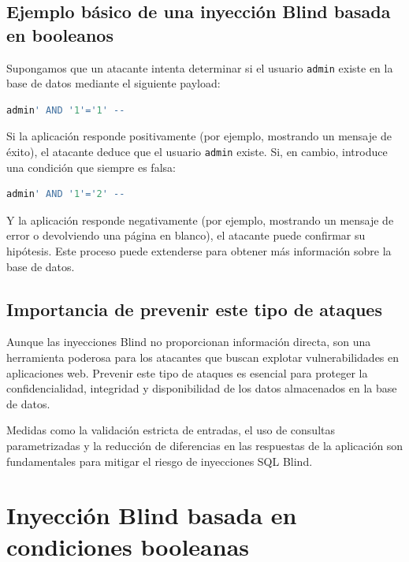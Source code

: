 \documentclass[a4paper,12pt]{article}
\begin{document}
\subsection{Ejemplo básico de una inyección Blind basada en booleanos}

Supongamos que un atacante intenta determinar si el usuario \texttt{admin} existe en la base de datos mediante el siguiente payload:

\begin{lstlisting}[language=SQL]
admin' AND '1'='1' --
\end{lstlisting}

Si la aplicación responde positivamente (por ejemplo, mostrando un mensaje de éxito), el atacante deduce que el usuario \texttt{admin} existe. Si, en cambio, introduce una condición que siempre es falsa:

\begin{lstlisting}[language=SQL]
admin' AND '1'='2' --
\end{lstlisting}

Y la aplicación responde negativamente (por ejemplo, mostrando un mensaje de error o devolviendo una página en blanco), el atacante puede confirmar su hipótesis. Este proceso puede extenderse para obtener más información sobre la base de datos.

\subsection{Importancia de prevenir este tipo de ataques}

Aunque las inyecciones Blind no proporcionan información directa, son una herramienta poderosa para los atacantes que buscan explotar vulnerabilidades en aplicaciones web. Prevenir este tipo de ataques es esencial para proteger la confidencialidad, integridad y disponibilidad de los datos almacenados en la base de datos.

Medidas como la validación estricta de entradas, el uso de consultas parametrizadas y la reducción de diferencias en las respuestas de la aplicación son fundamentales para mitigar el riesgo de inyecciones SQL Blind.

\section{Inyección Blind basada en condiciones booleanas}





\end{document}
